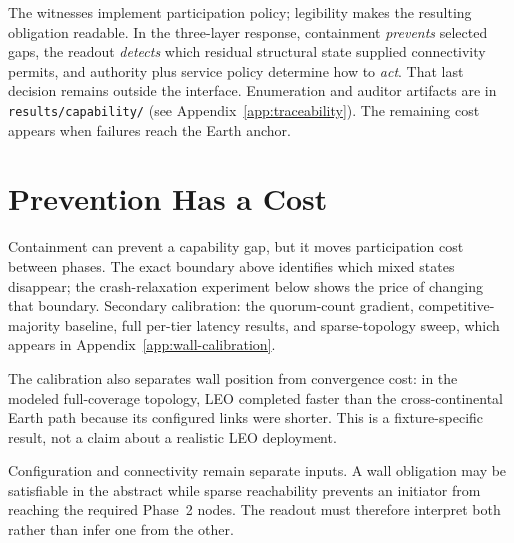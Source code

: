 \documentclass[letterpaper,twocolumn,10pt]{article}
\begin{document}
The witnesses implement participation policy; legibility makes the resulting obligation readable. In the three-layer response, containment \emph{prevents} selected gaps, the readout \emph{detects} which residual structural state supplied connectivity permits, and authority plus service policy determine how to \emph{act}. That last decision remains outside the interface. Enumeration and auditor artifacts are in \texttt{results/capability/} (see Appendix~\ref{app:traceability}). The remaining cost appears when failures reach the Earth anchor.

\section{Prevention Has a Cost}
\label{sec:results}

Containment can prevent a capability gap, but it moves participation cost between phases. The exact boundary above identifies which mixed states disappear; the crash-relaxation experiment below shows the price of changing that boundary. Secondary calibration: the quorum-count gradient, competitive-majority baseline, full per-tier latency results, and sparse-topology sweep, which appears in Appendix~\ref{app:wall-calibration}.

The calibration also separates wall position from convergence cost: in the modeled full-coverage topology, LEO completed faster than the cross-continental Earth path because its configured links were shorter. This is a fixture-specific result, not a claim about a realistic LEO deployment.

Configuration and connectivity remain separate inputs. A wall obligation may be satisfiable in the abstract while sparse reachability prevents an initiator from reaching the required Phase~2 nodes. The readout must therefore interpret both rather than infer one from the other.
\end{document}
